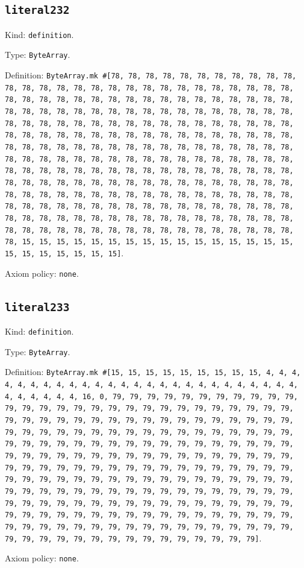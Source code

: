 \documentclass[11pt]{article}
\begin{document}
\subsection*{\texttt{literal232}}
\noindent Kind: \texttt{definition}.\par
\noindent Type: \texttt{ByteArray}.\par
\noindent Definition: \texttt{ByteArray.mk \#[78, 78, 78, 78, 78, 78, 78, 78, 78, 78, 78, 78, 78, 78, 78, 78, 78, 78, 78, 78, 78, 78, 78, 78, 78, 78, 78, 78, 78, 78, 78, 78, 78, 78, 78, 78, 78, 78, 78, 78, 78, 78, 78, 78, 78, 78, 78, 78, 78, 78, 78, 78, 78, 78, 78, 78, 78, 78, 78, 78, 78, 78, 78, 78, 78, 78, 78, 78, 78, 78, 78, 78, 78, 78, 78, 78, 78, 78, 78, 78, 78, 78, 78, 78, 78, 78, 78, 78, 78, 78, 78, 78, 78, 78, 78, 78, 78, 78, 78, 78, 78, 78, 78, 78, 78, 78, 78, 78, 78, 78, 78, 78, 78, 78, 78, 78, 78, 78, 78, 78, 78, 78, 78, 78, 78, 78, 78, 78, 78, 78, 78, 78, 78, 78, 78, 78, 78, 78, 78, 78, 78, 78, 78, 78, 78, 78, 78, 78, 78, 78, 78, 78, 78, 78, 78, 78, 78, 78, 78, 78, 78, 78, 78, 78, 78, 78, 78, 78, 78, 78, 78, 78, 78, 78, 78, 78, 78, 78, 78, 78, 78, 78, 78, 78, 78, 78, 78, 78, 78, 78, 78, 78, 78, 78, 78, 78, 78, 78, 78, 78, 78, 78, 78, 78, 78, 78, 78, 78, 78, 78, 78, 78, 78, 78, 78, 78, 78, 78, 78, 78, 78, 78, 78, 78, 78, 78, 78, 78, 78, 78, 78, 78, 78, 15, 15, 15, 15, 15, 15, 15, 15, 15, 15, 15, 15, 15, 15, 15, 15, 15, 15, 15, 15, 15, 15, 15]}.\par
\noindent Axiom policy: \texttt{none}.\par
\subsection*{\texttt{literal233}}
\noindent Kind: \texttt{definition}.\par
\noindent Type: \texttt{ByteArray}.\par
\noindent Definition: \texttt{ByteArray.mk \#[15, 15, 15, 15, 15, 15, 15, 15, 15, 4, 4, 4, 4, 4, 4, 4, 4, 4, 4, 4, 4, 4, 4, 4, 4, 4, 4, 4, 4, 4, 4, 4, 4, 4, 4, 4, 4, 4, 4, 4, 4, 16, 0, 79, 79, 79, 79, 79, 79, 79, 79, 79, 79, 79, 79, 79, 79, 79, 79, 79, 79, 79, 79, 79, 79, 79, 79, 79, 79, 79, 79, 79, 79, 79, 79, 79, 79, 79, 79, 79, 79, 79, 79, 79, 79, 79, 79, 79, 79, 79, 79, 79, 79, 79, 79, 79, 79, 79, 79, 79, 79, 79, 79, 79, 79, 79, 79, 79, 79, 79, 79, 79, 79, 79, 79, 79, 79, 79, 79, 79, 79, 79, 79, 79, 79, 79, 79, 79, 79, 79, 79, 79, 79, 79, 79, 79, 79, 79, 79, 79, 79, 79, 79, 79, 79, 79, 79, 79, 79, 79, 79, 79, 79, 79, 79, 79, 79, 79, 79, 79, 79, 79, 79, 79, 79, 79, 79, 79, 79, 79, 79, 79, 79, 79, 79, 79, 79, 79, 79, 79, 79, 79, 79, 79, 79, 79, 79, 79, 79, 79, 79, 79, 79, 79, 79, 79, 79, 79, 79, 79, 79, 79, 79, 79, 79, 79, 79, 79, 79, 79, 79, 79, 79, 79, 79, 79, 79, 79, 79, 79, 79, 79, 79, 79, 79, 79, 79, 79, 79, 79, 79, 79, 79, 79, 79, 79, 79, 79, 79, 79, 79, 79, 79, 79, 79, 79, 79, 79, 79, 79, 79, 79, 79, 79, 79, 79]}.\par
\noindent Axiom policy: \texttt{none}.\par
\end{document}
